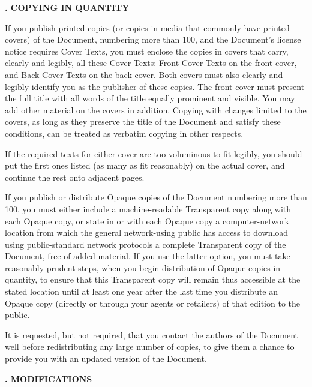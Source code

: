 \begin{flushleft}
    {\large\bfseries{}. COPYING IN QUANTITY\par}
\end{flushleft}


If you publish printed copies (or copies in media that commonly have
printed covers) of the Document, numbering more than 100, and the
Document's license notice requires Cover Texts, you must enclose the
copies in covers that carry, clearly and legibly, all these Cover
Texts: Front-Cover Texts on the front cover, and Back-Cover Texts on
the back cover.  Both covers must also clearly and legibly identify
you as the publisher of these copies.  The front cover must present
the full title with all words of the title equally prominent and
visible.  You may add other material on the covers in addition.
Copying with changes limited to the covers, as long as they preserve
the title of the Document and satisfy these conditions, can be treated
as verbatim copying in other respects.

If the required texts for either cover are too voluminous to fit
legibly, you should put the first ones listed (as many as fit
reasonably) on the actual cover, and continue the rest onto adjacent
pages.

If you publish or distribute Opaque copies of the Document numbering
more than 100, you must either include a machine-readable Transparent
copy along with each Opaque copy, or state in or with each Opaque copy
a computer-network location from which the general network-using
public has access to download using public-standard network protocols
a complete Transparent copy of the Document, free of added material.
If you use the latter option, you must take reasonably prudent steps,
when you begin distribution of Opaque copies in quantity, to ensure
that this Transparent copy will remain thus accessible at the stated
location until at least one year after the last time you distribute an
Opaque copy (directly or through your agents or retailers) of that
edition to the public.

It is requested, but not required, that you contact the authors of the
Document well before redistributing any large number of copies, to give
them a chance to provide you with an updated version of the Document.


\begin{flushleft}
    {\large\bfseries{}. MODIFICATIONS\par}
\end{flushleft}

